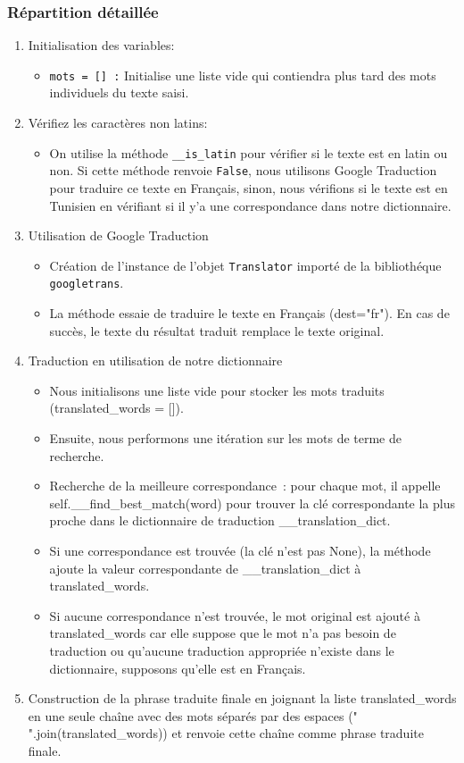\subsubsection{Répartition détaillée}
\begin{enumerate}
	\item Initialisation des variables:
	      \begin{itemize}
		      \item \texttt{mots = [] :} Initialise une liste vide qui contiendra plus tard des mots individuels du texte saisi.
	      \end{itemize}
	\item Vérifiez les caractères non latins:
	      \begin{itemize}
		      \item On utilise la méthode \texttt{\_\_is\_latin} pour vérifier si le texte est en latin ou non. Si cette méthode renvoie \texttt{False}, nous utilisons Google Traduction pour traduire ce texte en Français, sinon, nous vérifions si le texte est en Tunisien en vérifiant si il y'a une correspondance dans notre dictionnaire.
	      \end{itemize}
	\item Utilisation de Google Traduction
	      \begin{itemize}
		      \item Création de l'instance de l'objet \texttt{Translator} importé de la bibliothéque \texttt{googletrans}.
		      \item La méthode essaie de traduire le texte en Français (dest="fr"). En cas de succès, le texte du résultat traduit remplace le texte original.
	      \end{itemize}
	\item Traduction en utilisation de notre dictionnaire
	      \begin{itemize}
		      \item Nous initialisons une liste vide pour stocker les mots traduits (translated\_words = []).
		      \item Ensuite, nous performons une itération sur les mots de terme de recherche.
		      \item Recherche de la meilleure correspondance : pour chaque mot, il appelle self.\_\_find\_best\_match(word) pour trouver la clé correspondante la plus proche dans le dictionnaire de traduction \_\_translation\_dict.
		      \item Si une correspondance est trouvée (la clé n'est pas None), la méthode ajoute la valeur correspondante de \_\_translation\_dict à translated\_words.
		      \item Si aucune correspondance n'est trouvée, le mot original est ajouté à translated\_words car elle suppose que le mot n'a pas besoin de traduction ou qu'aucune traduction appropriée n'existe dans le dictionnaire, supposons qu'elle est en Français.
	      \end{itemize}
	\item Construction de la phrase traduite finale en joignant la liste translated\_words en une seule chaîne avec des mots séparés par des espaces (" ".join(translated\_words)) et renvoie cette chaîne comme phrase traduite finale.
\end{enumerate}

